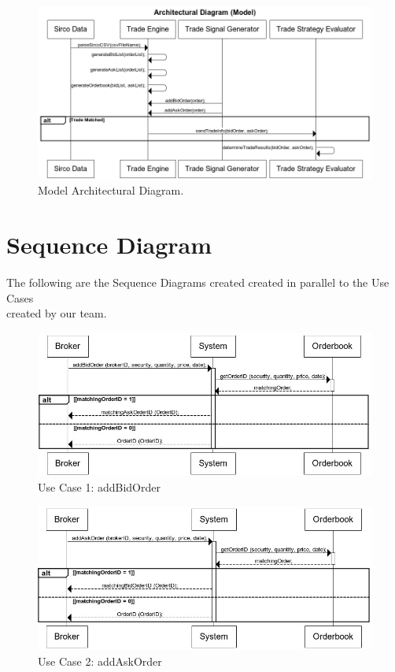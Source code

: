 \documentclass[a4paper]{article}
\begin{document}
\begin{landscape}
\begin{figure}
  
  \centering
    \includegraphics[width=1.6\textwidth]{images/aSequenceDiagram}
    \caption{Model Architectural Diagram.}
\end{figure}
\end {landscape}


\section {Sequence Diagram} 

The following are the Sequence Diagrams created created in parallel to the Use Cases \\
created by our team. \\

\begin{figure}[H] 
   \includegraphics[width=1\textwidth]{images/addBidOrder}
   \caption{Use Case 1: addBidOrder}
\end{figure}

\begin{figure}[H]
   \includegraphics[width=1\textwidth]{images/addAskOrder}
   \caption{Use Case 2: addAskOrder}
\end{figure}
\end{document}
